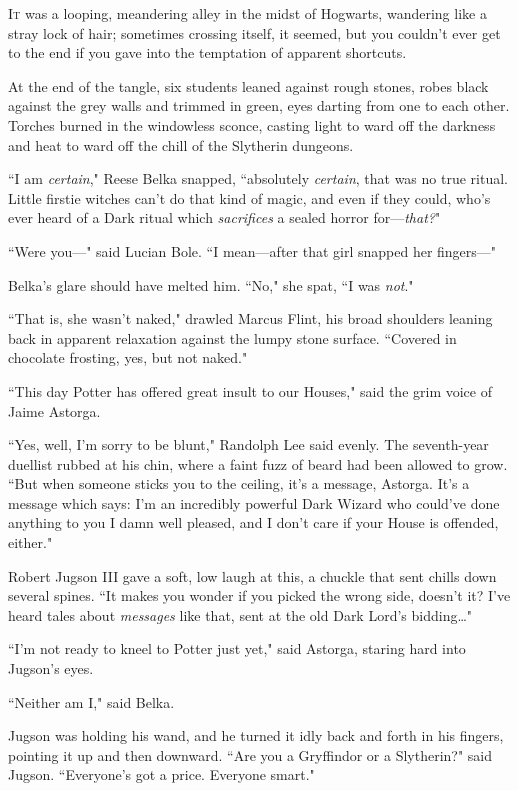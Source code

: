 
\lettrine{I}{t} was a looping, meandering alley in the midst of Hogwarts, wandering like a stray lock of hair; sometimes crossing itself, it seemed, but you couldn't ever get to the end if you gave into the temptation of apparent shortcuts.

At the end of the tangle, six students leaned against rough stones, robes black against the grey walls and trimmed in green, eyes darting from one to each other. Torches burned in the windowless sconce, casting light to ward off the darkness and heat to ward off the chill of the Slytherin dungeons.

``I am \emph{certain}," Reese Belka snapped, ``absolutely \emph{certain}, that was no true ritual. Little firstie witches can't do that kind of magic, and even if they could, who's ever heard of a Dark ritual which \emph{sacrifices} a sealed horror for—\emph{that?}"

``Were you—" said Lucian Bole. ``I mean—after that girl snapped her fingers—"

Belka's glare should have melted him. ``No," she spat, ``I was \emph{not}."

``That is, she wasn't naked," drawled Marcus Flint, his broad shoulders leaning back in apparent relaxation against the lumpy stone surface. ``Covered in chocolate frosting, yes, but not naked."

``This day Potter has offered great insult to our Houses," said the grim voice of Jaime Astorga.

``Yes, well, I'm sorry to be blunt," Randolph Lee said evenly. The seventh-year duellist rubbed at his chin, where a faint fuzz of beard had been allowed to grow. ``But when someone sticks you to the ceiling, it's a message, Astorga. It's a message which says: I'm an incredibly powerful Dark Wizard who could've done anything to you I damn well pleased, and I don't care if your House is offended, either."

Robert Jugson III gave a soft, low laugh at this, a chuckle that sent chills down several spines. ``It makes you wonder if you picked the wrong side, doesn't it? I've heard tales about \emph{messages} like that, sent at the old Dark Lord's bidding{\ldots}"

``I'm not ready to kneel to Potter just yet," said Astorga, staring hard into Jugson's eyes.

``Neither am I," said Belka.

Jugson was holding his wand, and he turned it idly back and forth in his fingers, pointing it up and then downward. ``Are you a Gryffindor or a Slytherin?" said Jugson. ``Everyone's got a price. Everyone smart."

